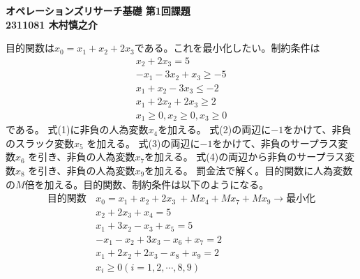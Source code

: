 \documentclass[uplatex,dvipdfmx,a4paper,10pt]{jsarticle}
\begin{document}
    \begin{center}
        {\Large{\bf オペレーションズリサーチ基礎 第1回課題}} \\
        {\bf 2311081 木村慎之介} \\
    \end{center}

    目的関数は\(x_0=x_1+x_2+2x_3\)である。これを最小化したい。制約条件は
\begin{eqnarray}
  x_2 + 2x_3 = 5 \\
  -x_1-3x_2+x_3\geq -5 \\
  x_1+x_2-3x_3 \leq -2 \\
  x_1 + 2x_2 + 2x_3 \geq 2 \\
  x_1\geq 0, x_2\geq 0, x_3\geq 0
\end{eqnarray}
である。
\newline 式(1)に非負の人為変数\(x_4\)を加える。
\newline 式(2)の両辺に\(-1\)をかけて、非負のスラック変数\(x_5\) を加える。
\newline 式(3)の両辺に\(-1\)をかけて、非負のサープラス変数\(x_6\) を引き、非負の人為変数\(x_7\)を加える。
\newline 式(4)の両辺から非負のサープラス変数\(x_8\) を引き、非負の人為変数\(x_9\)を加える。
\newline 罰金法で解く。目的関数に人為変数の\(M\)倍を加える。目的関数、制約条件は以下のようになる。
\begin{eqnarray}
  目的関数 \hspace{2pt} &x_0 =x_1+x_2+2x_3\ + Mx_4 + Mx_7 + Mx_9  \rightarrow 最小化\\
  &x_2 + 2x_3 + x_4 = 5 \\
  &x_1+3x_2-x_3+x_5 = 5 \\
  &-x_1-x_2+3x_3 -x_6 + x_7 =2 \\
  &x_1 + 2x_2 + 2x_3 -x_8 + x_9 = 2 \\
  &x_i\geq 0 (i = 1,2,\cdots, 8, 9)
\end{eqnarray}
\end{document}
